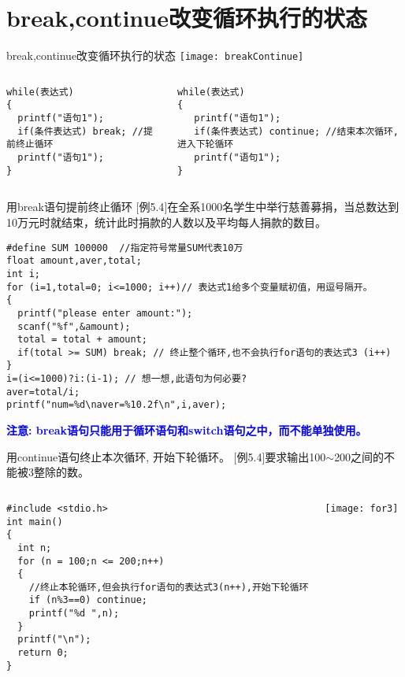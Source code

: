 \section{break,continue改变循环执行的状态}

\begin{frame}{break,continue改变循环执行的状态}
\centering
\texttt{[image: breakContinue]}
\begin{columns}[T]
\begin{lstlisting}
while(表达式)
{
  printf("语句1");
  if(条件表达式) break; //提前终止循环
  printf("语句1");
}
\end{lstlisting}
\begin{lstlisting}[frame=leftline]
while(表达式)
{
   printf("语句1");
   if(条件表达式) continue; //结束本次循环, 进入下轮循环
   printf("语句1");
}
\end{lstlisting}
\end{columns}
\end{frame}

\begin{frame}{用break语句提前终止循环}
$[$例5.4$]$在全系1000名学生中举行慈善募捐，当总数达到10万元时就结束，统计此时捐款的人数以及平均每人捐款的数目。
\begin{lstlisting}
#define SUM 100000  //指定符号常量SUM代表10万
float amount,aver,total; 
int i;
for (i=1,total=0; i<=1000; i++)// 表达式1给多个变量赋初值，用逗号隔开。
{
  printf("please enter amount:");
  scanf("%f",&amount);
  total = total + amount; 
  if(total >= SUM) break; // 终止整个循环,也不会执行for语句的表达式3 (i++)
}
i=(i<=1000)?i:(i-1); // 想一想,此语句为何必要?
aver=total/i;
printf("num=%d\naver=%10.2f\n",i,aver); 
\end{lstlisting}
\textbf{\textcolor{blue}{注意: break语句只能用于循环语句和switch语句之中，而不能单独使用。}}
\end{frame}

\begin{frame}{用continue语句终止本次循环, 开始下轮循环。}
$[$例5.4$]$要求输出100$\sim$200之间的不能被3整除的数。
\vspace{-0.3cm}
\begin{columns}
\begin{lstlisting}
#include <stdio.h>
int main()
{
  int n;
  for (n = 100;n <= 200;n++)
  {
    //终止本轮循环,但会执行for语句的表达式3(n++),开始下轮循环
    if (n%3==0) continue;
    printf("%d ",n);
  }
  printf("\n");
  return 0;
} 
\end{lstlisting}
\texttt{[image: for3]}
\end{columns}
\end{frame}

